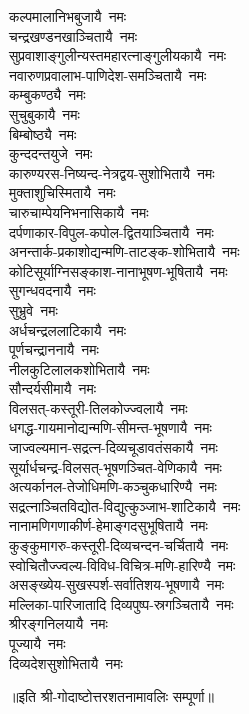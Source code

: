 \begin{multicols}{2}
\begin{flushleft}
कल्पमालानिभबुजायै~नमः\\
चन्द्रखण्डनखाञ्चितायै~नमः\hfill{}\\
सुप्रवाशाङ्गुलीन्यस्तमहा\-रत्नाङ्गुलीयकायै~नमः\\
नवारुणप्रवालाभ-पाणिदेश-समञ्चितायै~नमः\\
कम्बुकण्ठ्यै~नमः\\
सुचुबुकायै~नमः\\
बिम्बोष्ठ्यै~नमः\\
कुन्ददन्तयुजे~नमः\\
कारुण्यरस-निष्यन्द-नेत्रद्वय-सुशोभितायै~नमः\\
मुक्ताशुचिस्मितायै~नमः\\
चारुचाम्पेयनिभनासिकायै~नमः\\
दर्पणाकार-विपुल-कपोल-द्वितयाञ्चितायै~नमः\hfill{}\\
अनन्तार्क-प्रकाशोद्यन्मणि-ताटङ्क-शोभितायै~नमः\\
कोटिसूर्याग्निसङ्काश-नानाभूषण-भूषितायै~नमः\\
सुगन्धवदनायै~नमः\\
सुभ्रुवे~नमः\\
अर्धचन्द्रललाटिकायै~नमः\\
पूर्णचन्द्राननायै~नमः\\
नीलकुटिलालकशोभितायै~नमः\\
सौन्दर्यसीमायै~नमः\\
विलसत्-कस्तूरी-तिलकोज्ज्वलायै~नमः\\
धगद्ध-गायमानोद्यन्मणि-सीमन्त-भूषणायै~नमः\hfill{}\\
जाज्वल्यमान-सद्रत्न-दिव्यचूडावतंसकायै~नमः\\
सूर्यार्धचन्द्र-विलसत्-भूषणञ्चित-वेणिकायै~नमः\\
अत्यर्कानल-तेजोधिमणि-कञ्चुकधारिण्यै~नमः\\
सद्रत्नाञ्चितविद्योत-विद्युत्कुञ्जाभ-शाटिकायै~नमः\\
नानामणिगणाकीर्ण-हेमाङ्गदसुभूषितायै~नमः\\
कुङ्कुमागरु-कस्तूरी-दिव्यचन्दन-चर्चितायै~नमः\\
स्वोचितौज्ज्वल्य-विविध-विचित्र-मणि-हारिण्यै~नमः\\
असङ्ख्येय-सुखस्पर्श-सर्वातिशय-भूषणायै~नमः\\
मल्लिका-पारिजातादि  दिव्यपुष्प-स्रगञ्चितायै~नमः\\
श्रीरङ्गनिलयायै~नमः\hfill{}\\
पूज्यायै~नमः\\
दिव्यदेशसुशोभितायै~नमः\\
\end{flushleft}
\end{multicols}
॥इति श्री-गोदाष्टोत्तरशतनामावलिः सम्पूर्णा॥

